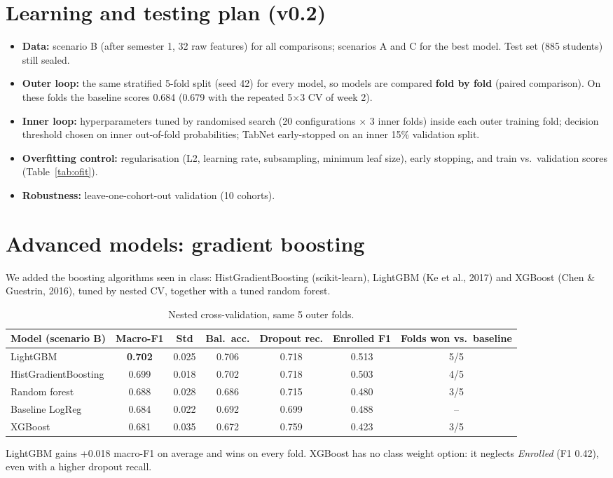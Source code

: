 \documentclass[11pt,a4paper]{article}
\begin{document}
\section{Learning and testing plan (v0.2)}
\begin{itemize}
\item \textbf{Data:} scenario B (after semester 1, 32 raw features) for all comparisons; scenarios A and C for the best model. Test set (885 students) still sealed.
\item \textbf{Outer loop:} the same stratified 5-fold split (seed 42) for every model, so models are compared \textbf{fold by fold} (paired comparison). On these folds the baseline scores 0.684 (0.679 with the repeated 5$\times$3 CV of week 2).
\item \textbf{Inner loop:} hyperparameters tuned by randomised search (20 configurations $\times$ 3 inner folds) inside each outer training fold; decision threshold chosen on inner out-of-fold probabilities; TabNet early-stopped on an inner 15\% validation split.
\item \textbf{Overfitting control:} regularisation (L2, learning rate, subsampling, minimum leaf size), early stopping, and train vs.\ validation scores (Table~\ref{tab:ofit}).
\item \textbf{Robustness:} leave-one-cohort-out validation (10 cohorts).
\end{itemize}

\section{Advanced models: gradient boosting}
We added the boosting algorithms seen in class: HistGradientBoosting (scikit-learn), LightGBM (Ke et al., 2017) and XGBoost (Chen \& Guestrin, 2016), tuned by nested CV, together with a tuned random forest.

\begin{table}[!htb]
\centering\footnotesize
\begin{tabular}{@{}lcccccc@{}}
\toprule
Model (scenario B) & Macro-F1 & Std & Bal.\ acc. & Dropout rec. & Enrolled F1 & Folds won vs.\ baseline\\
\midrule
LightGBM & \textbf{0.702} & 0.025 & 0.706 & 0.718 & 0.513 & 5/5\\
HistGradientBoosting & 0.699 & 0.018 & 0.702 & 0.718 & 0.503 & 4/5\\
Random forest & 0.688 & 0.028 & 0.686 & 0.715 & 0.480 & 3/5\\
Baseline LogReg & 0.684 & 0.022 & 0.692 & 0.699 & 0.488 & --\\
XGBoost & 0.681 & 0.035 & 0.672 & 0.759 & 0.423 & 3/5\\
\bottomrule
\end{tabular}
\caption{Nested cross-validation, same 5 outer folds.}
\end{table}
LightGBM gains +0.018 macro-F1 on average and wins on every fold. XGBoost has no class weight option: it neglects \textit{Enrolled} (F1 0.42), even with a higher dropout recall.
\end{document}
